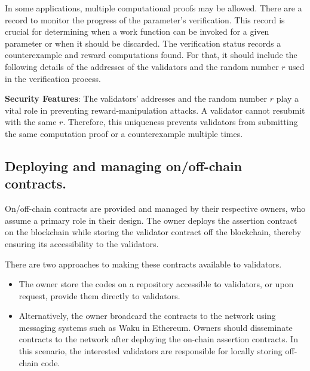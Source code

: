 \documentclass[runningheads]{llncs}
\begin{document}
In some applications, multiple computational proofs may be allowed. There are a record to monitor the progress of the parameter's verification. This record is crucial for determining when a work function can be invoked for a given parameter or when it should be discarded. The verification status records a counterexample and reward computations found. For that, it should include the following details of the addresses of the validators and the random number $r$ used in the verification process.


\textbf{Security Features}:
The validators' addresses and the random number $r$ play a vital role in preventing reward-manipulation attacks. A validator cannot resubmit with the same $r$. Therefore, this uniqueness prevents validators from submitting the same computation proof or a counterexample multiple times.

\subsection{Deploying and managing on/off-chain contracts.}
On/off-chain contracts are provided and managed by their respective owners, who assume a primary role in their design. The owner deploys the assertion contract on the blockchain while storing the validator contract off the blockchain, thereby ensuring its accessibility to the validators.

There are two approaches to making these contracts available to validators.
\begin{itemize}
\item The owner store the codes on a repository accessible to validators, or upon request, provide them directly to validators.
\item Alternatively, the owner broadcard the contracts to the network using messaging systems such as Waku in Ethereum. Owners should disseminate contracts to the network after deploying the on-chain assertion contracts. In this scenario, the interested validators are responsible for locally storing off-chain code.
\end{itemize}
\end{document}
